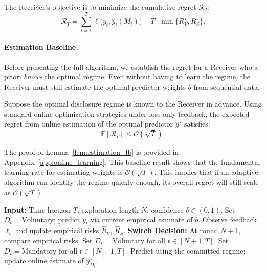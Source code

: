 The Receiver's objective is to minimize the cumulative regret $\mathcal{R}_T$:
\begin{equation}
    \mathcal{R}_T = \sum_{t=1}^T \ell\big(y_t, \hat{y}_t(M_t)\big) - T \cdot \min \{ R_V^\star, R_S^\star \}.
\end{equation}

\paragraph{Estimation Baseline.}
Before presenting the full algorithm, we establish the regret for a Receiver who a priori \emph{knows} the optimal regime. Even without having to learn the regime, the Receiver must still estimate the optimal predictor weights $b$ from sequential data.

\begin{lemma}\label{lem:estimation_lb}
Suppose the optimal disclosure regime is known to the Receiver in advance. Using standard online optimization strategies under loss-only feedback, the expected regret from online estimation of the optimal predictor $\hat{y}^\star$ satisfies:
\begin{equation}
    \mathbb{E}[\mathcal{R}_T] \le \mathcal{O}(\sqrt{T}).
\end{equation}
\end{lemma}

The proof of Lemma~\ref{lem:estimation_lb} is provided in Appendix~\ref{app:online_learning}. This baseline result shows that the fundamental learning rate for estimating weights is $\mathcal{O}(\sqrt{T})$. This implies that if an adaptive algorithm can identify the regime quickly enough, its overall regret will still scale as $\mathcal{O}(\sqrt{T})$.

\begin{algorithm}[!ht]
\caption{Explore-Then-Commit (ETC) Disclosure Algorithm}
\label{alg:etc_disclosure}
\begin{algorithmic}[1]
\State \textbf{Input:} Time horizon $T$, exploration length $N$, confidence $\delta \in (0,1)$.
    \State Set $D_t = \text{Voluntary}$; predict $\hat{y}_t$ via current empirical estimate of $b$.
    \State Observe feedback $\ell_t$ and update empirical risks $\hat{R}_V$, $\hat{R}_S$.
\EndFor
\State \textbf{Switch Decision:} At round $N+1$, compare empirical risks.
    \State Set $D_t = \text{Voluntary}$ for all $t \in [N+1, T]$.
\Else
    \State Set $D_t = \text{Mandatory}$ for all $t \in [N+1, T]$.
\EndIf
{}
    \State Predict using the committed regime; update online estimate of $\hat{y}^\star_{D_t}$.
\EndFor
\end{algorithmic}
\end{algorithm}

